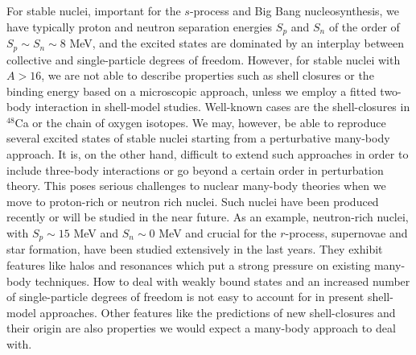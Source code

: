 For stable nuclei, important for the $s$-process and Big Bang nucleosynthesis,
we have typically proton and neutron separation energies 
$S_p$ and $S_n$ of the  order of $S_p\sim S_n \sim 8$ MeV,
and the excited states are dominated by an interplay 
between collective and single-particle  degrees of freedom. 
However, for stable nuclei with $A > 16$, we are 
not able to describe properties such as shell 
closures or the binding energy based on a microscopic approach,
unless we employ a fitted two-body interaction in shell-model studies. 
Well-known cases are the shell-closures in $^{48}$Ca or 
the chain of oxygen isotopes.
We may, however, be able to reproduce several excited 
states of stable nuclei starting from a perturbative 
many-body approach.  It is, on the other hand, difficult 
to extend such approaches in 
order to include three-body interactions or go 
beyond a certain order in perturbation theory. 
This poses serious challenges to nuclear many-body 
theories when we move to proton-rich
or neutron rich nuclei. Such nuclei have been produced recently 
or will be studied in the near future. As an example, neutron-rich nuclei, with 
$S_p\sim 15$ MeV and $S_n\sim 0$ MeV and crucial 
for the $r$-process, supernovae and 
star formation, have been studied extensively in 
the last years. They exhibit features 
like halos and resonances which put a strong pressure on existing   
many-body techniques. How to deal with weakly bound states and 
an increased number of single-particle degrees of 
freedom is not easy to account for in present shell-model 
approaches. Other features like the predictions of 
new shell-closures and their origin
are also properties we would expect a many-body approach to deal with. 





